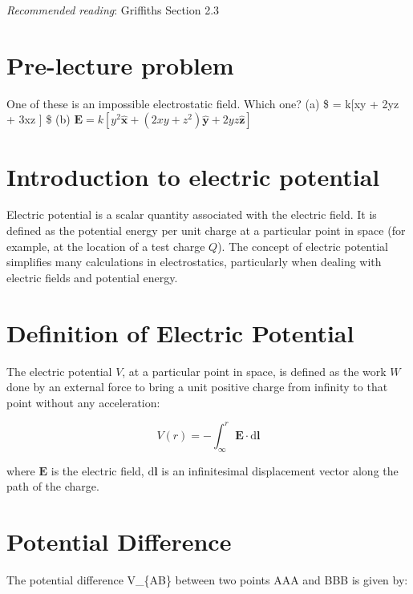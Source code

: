 \documentclass[
  letterpaper,
  DIV=11,
  numbers=noendperiod]{scrreprt}
\begin{document}
\emph{Recommended reading}: Griffiths Section 2.3

\section{Pre-lecture problem}\label{pre-lecture-problem-1}

One of these is an impossible electrostatic field. Which one? (a)
\$ = k{[}xy  +
2yz + 3xz  {]} \$ (b)
\(\mathrm{\mathbf{E}}= k[y^2 \hat{\mathrm{\mathbf{x}}} + (2xy + z^2)\hat{\mathrm{\mathbf{y}}} + 2yz \hat{\mathrm{\mathbf{z}}} ]\)

\section{Introduction to electric
potential}\label{introduction-to-electric-potential}

Electric potential is a scalar quantity associated with the electric
field. It is defined as the potential energy per unit charge at a
particular point in space (for example, at the location of a test charge
\(Q\)). The concept of electric potential simplifies many calculations
in electrostatics, particularly when dealing with electric fields and
potential energy.

\section{Definition of Electric
Potential}\label{definition-of-electric-potential}

The electric potential \(V\), at a particular point in space, is defined
as the work \(W\) done by an external force to bring a unit positive
charge from infinity to that point without any acceleration:

\[ V(r)=−\int_\infty^r \mathrm{\mathbf{E}}\cdot \mathrm{d}\mathrm{\mathbf{l}}\]

where \(\mathrm{\mathbf{E}}\) is the electric field,
\(\mathrm{d}\mathrm{\mathbf{l}}\) is an infinitesimal displacement
vector along the path of the charge.

\section{Potential Difference}\label{potential-difference}

The potential difference V\_\{AB\} between two points AAA and BBB is
given by:
\end{document}

